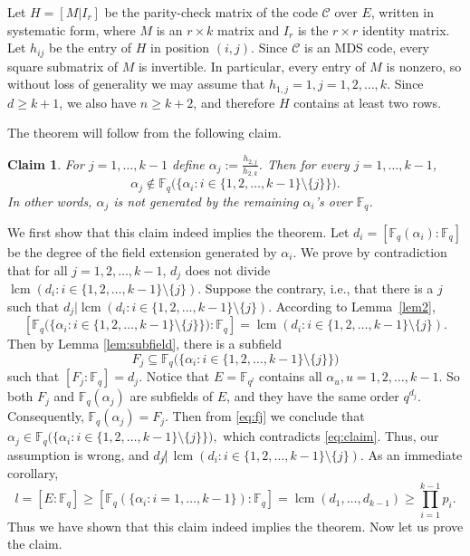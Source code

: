 \documentclass[11pt,onecolumn]{IEEEtran}
\newtheorem{claim}{Claim}
\newcommand{\cC}{\mathcal{C}}
\DeclareMathOperator{\lcm}{lcm}
\begin{document}
Let $H=[M | I_r]$ be the parity-check matrix of the code ${\cC}$ over $E$, written in systematic form, where $M$ is an $r\times k$ matrix and $I_r$ is the $r\times r$ identity matrix.  Let $h_{ij}$ be the entry of $H$ in position $(i,j).$ Since ${\cC}$ is an MDS code, every square submatrix of $M$ is invertible. In particular, every entry of $M$ is nonzero, so without loss of generality we may assume that $h_{1,j}=1, j=1,2,\dots, k.$
Since $d\ge k+1$, we also have $n\ge k+2$, and therefore $H$ contains at least two rows.

The theorem will follow from the following claim. 

\begin{claim}
 For $j=1,\dots,k-1$ define $\alpha_j := \frac{h_{2,j}}{h_{2,k}}$.  Then for every $j=1,\dots,k-1$, 
  \begin{equation}\label{eq:claim}
\alpha_j\notin \mathbb{F}_q \big( \big\{ \alpha_i:i\in \{1,2,\dots,k-1\}\setminus\{j\} \big\} \big).
  \end{equation}
 In other words,  $\alpha_j$ is not generated by the remaining  $\alpha_i$'s over $\mathbb{F}_q$.
\end{claim}

We first show that this claim indeed implies the theorem.  
Let $d_i=[\mathbb{F}_q(\alpha_i):\mathbb{F}_q]$ be the degree of the field extension generated by 
$\alpha_i$. We prove by contradiction that for all $j=1,2,\dots,k-1$, $d_j$ does not divide 
$\lcm(d_i:i\in \{1,2,\dots,k-1\} \setminus \{j \})$. Suppose the contrary, i.e., that there is a $j$ such that $d_j|\lcm(d_i:i\in \{1,2,\dots,k-1\} \setminus \{j\}).$ According to Lemma~\ref{lem2},
$$
[\mathbb{F}_q \big( \big\{ \alpha_i:i\in \{1,2,\dots,k-1\}\setminus\{j\} \big\} \big) : \mathbb{F}_q]
= \lcm(d_i:i\in \{1,2,\dots,k-1\} \setminus \{j \}).
$$
Then by Lemma \ref{lem:subfield}, there is a subfield 
    \begin{equation}\label{eq:fj}
F_j \subseteq \mathbb{F}_q \big( \big\{ \alpha_i:i\in \{1,2,\dots,k-1\}\setminus\{j\} \big\} \big) 
    \end{equation}
such that $[F_j :\mathbb{F}_q]=d_j$. Notice that $E=\mathbb{F}_{q^l}$ contains all $\alpha_u, u=1,2,\dots,k-1$.
So both $F_j$ and $\mathbb{F}_q(\alpha_j)$ are subfields of $E$, and they have the same order $q^{d_j}$.
Consequently, $\mathbb{F}_q(\alpha_j) = F_j$. Then from \eqref{eq:fj} we conclude that 
$\alpha_j\in\mathbb{F}_q \big( \big\{ \alpha_i:i\in \{1,2,\dots,k-1\}\setminus\{j\} \big\} \big),$ which contradicts 
\eqref{eq:claim}. Thus, our assumption is wrong, and $d_j\not|\,\lcm(d_i:i\in \{1,2,\dots,k-1\} \setminus \{j \})$. 
As an immediate corollary,
$$
l= [E:\mathbb{F}_q] \ge
[\mathbb{F}_q(\{\alpha_i:i=1,\dots,k-1\}):\mathbb{F}_q]=\lcm(d_1,\dots,d_{k-1})\geq \prod_{i=1}^{k-1}p_i.
$$ 
Thus we have shown that this claim indeed implies the theorem.  Now let us prove the claim.
\end{document}
